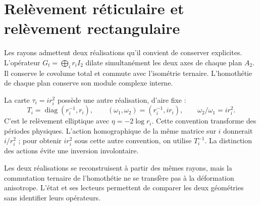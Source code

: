 \section{Relèvement réticulaire et relèvement rectangulaire}

Les rayons admettent deux réalisations qu’il convient de conserver explicites. L’opérateur \(G_t=\bigoplus_i r_iI_2\) dilate simultanément les deux axes de chaque plan \(A_2\). Il conserve le covolume total et commute avec l’isométrie ternaire. L’homothétie de chaque plan conserve son module complexe interne.

La carte \(\tau_i=ir_i^2\) possède une autre réalisation, d'aire fixe :
\[
 T_i=\operatorname{diag}(r_i^{-1},r_i),\qquad
 (\omega_1,\omega_2)=(r_i^{-1},ir_i),\qquad
 \omega_2/\omega_1=ir_i^2.
\]
C'est le relèvement elliptique avec \(\eta=-2\log r_i\). Cette convention transforme des périodes physiques. L'action homographique de la même matrice sur \(i\) donnerait \(i/r_i^2\) ; pour obtenir \(ir_i^2\) sous cette autre convention, on utilise \(T_i^{-1}\). La distinction des actions évite une inversion involontaire.

Les deux réalisations se reconstruisent à partir des mêmes rayons, mais la commutation ternaire de l’homothétie ne se transfère pas à la déformation anisotrope. L’état et ses lecteurs permettent de comparer les deux géométries sans identifier leurs opérateurs.

